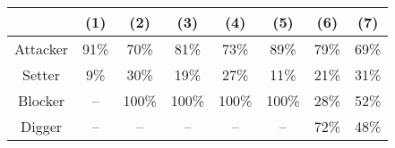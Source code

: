 \begin{tabular}{c|ccccccc}
    &  (1)&  (2)&  (3)&  (4)&  (5)&  (6)&  (7)\\
    \hline Attacker&  91\%&  70\%&  81\%&  73\%&  89\%&  79\%&  69\%\\
    Setter&  9\%&  30\%&  19\%&  27\%&  11\%&  21\%&  31\%\\ \hline Blocker& --& 100\%& 100\%& 100\%& 100\%& 28\%& 52\%\\
    Digger&  --&  --&  --&  --&  --&  72\%&  48\%\\
\end{tabular}

